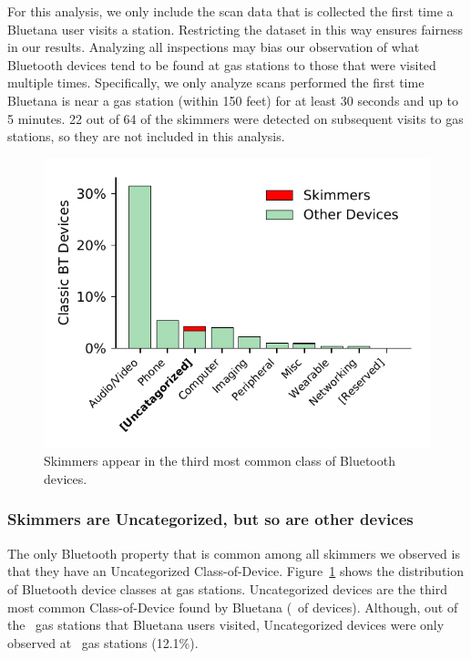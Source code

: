 %
%
For this analysis, we only include the scan data that is collected the first
time a Bluetana user visits a station.
%
Restricting the dataset in this way ensures fairness in our results. Analyzing all
inspections may bias our observation of what Bluetooth devices tend to be found at gas stations to those that
were visited multiple times.
%
Specifically, we only analyze scans
performed the first time Bluetana is near a gas station (within 150 feet) for
at least 30 seconds and up to 5 minutes.
%
22 out of 64 of the skimmers were detected on subsequent
visits to gas stations, so they are not included in this analysis.
% 
%


\begin{figure}[!h]
    \centering
    \captionsetup{justification=centering}
    \includegraphics[width=0.6\linewidth]{skimmer/plots/hist_device_class.pdf}
    \caption{
    \label{fig:hist_device_class}
    Skimmers appear in the third most common class of Bluetooth devices.
    }
\end{figure}
\subsubsection*{Skimmers are Uncategorized, but so are other devices} %

The only Bluetooth property that is common among all skimmers we observed is
that they have an Uncategorized Class-of-Device.
%
Figure~\ref{fig:hist_device_class} shows the distribution of Bluetooth device classes at gas stations.
%
Uncategorized devices are the third most common Class-of-Device found by Bluetana (\percentbtuncategorized~of devices).
%
Although, out of the \visitedgasstations~gas stations that Bluetana users visited, Uncategorized devices were only observed at \totaluncatstation~gas stations (12.1\%).




